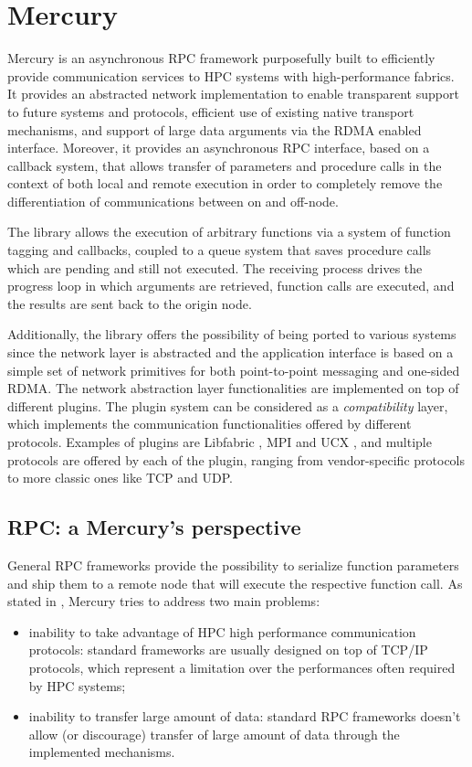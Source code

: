 \chapter{Mercury}
\label{sec:mercury}
Mercury \cite{mochi-core, mercury} is an asynchronous RPC framework purposefully built to efficiently provide communication services to HPC systems with high-performance fabrics. It provides an abstracted network implementation to enable transparent support to future systems and protocols, efficient use of existing native transport mechanisms, and support of large data arguments via the RDMA enabled interface. Moreover, it provides an asynchronous RPC interface, based on a callback system, that allows transfer of parameters and procedure calls in the context of both local and remote execution in order to completely remove the differentiation of communications between on and off-node.

The library allows the execution of arbitrary functions via a system of function tagging and callbacks, coupled to a queue system that saves procedure calls which are pending and still not executed. The receiving process drives the progress loop in which arguments are retrieved, function calls are executed, and the results are sent back to the origin node.

Additionally, the library offers the possibility of being ported to various systems since the network layer is abstracted and the application interface is based on a simple set of network primitives for both point-to-point messaging and one-sided RDMA. The network abstraction layer functionalities are implemented on top of different plugins. The plugin system can be considered as a \textit{compatibility} layer, which implements the communication functionalities offered by different protocols. Examples of plugins are Libfabric \cite{libfabric, ofi_plugin}, MPI \cite{mpi_plugin} and UCX \cite{openucx}, and multiple protocols are offered by each of the plugin, ranging from vendor-specific protocols to more classic ones like TCP and UDP.\newline

\section{RPC: a Mercury's perspective}
General RPC frameworks provide the possibility to serialize function parameters and ship them to a remote node that will execute the respective function call. As stated in \cite{mercury}, Mercury tries to address two main problems:
\begin{itemize}
    \item inability to take advantage of HPC high performance communication protocols: standard frameworks are usually designed on top of TCP/IP protocols, which represent a limitation over the performances often required by HPC systems;
    \item inability to transfer large amount of data: standard RPC frameworks doesn't allow (or discourage) transfer of large amount of data through the implemented mechanisms.
\end{itemize}

